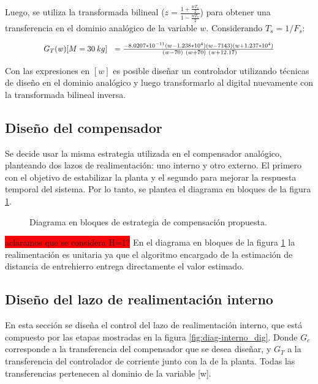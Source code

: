Luego, se utiliza la transformada bilineal ($z=\frac{1+\frac{wT_s}{2}}{1-\frac{wT_s}{2}}$) para obtener una transferencia en el dominio analógico de la variable $w$. Considerando $T_s=1/F_s$:

\begin{equation} \label{eq_Gtotal_w_m30}
	\resizebox{.8\hsize}{!}
	{
		$G_T(w)[M=30\:kg]\ \ =\frac{-8.0207*10^{-11}(w-1.238*10^4)(w-7143)(w+1.237*10^4)}{\ (w-70)\ (w+70)\ (w+12.17)}$
	}
\end{equation}


Con las expresiones en $[w]$ es posible diseñar un controlador utilizando técnicas de diseño en el dominio analógico y luego transformarlo al digital nuevamente con la transformada bilineal inversa.



\subsection{Diseño del compensador}

Se decide usar la misma estrategia utilizada en el compensador analógico, planteando dos lazos de realimentación: uno interno y otro externo. El primero con el objetivo de estabilizar la planta y el segundo para mejorar la respuesta temporal del sistema. Por lo tanto, se plantea el diagrama en bloques de la figura \ref{fig:diag-en-bloques-comp_digital}.

\begin{figure}[H]
	\centering
	\scalebox{0.8}{}
	\caption{Diagrama en bloques de estrategia de compensación propuesta.}	\label{fig:diag-en-bloques-comp_digital}
\end{figure}

\colorbox{red}{aclaramos que se considera H=1?}
En el diagrama en bloques de la figura \ref{fig:diag-en-bloques-comp_digital} la realimentación es unitaria ya que el algoritmo encargado de la estimación de distancia de entrehierro entrega directamente el valor estimado.

\subsection{Diseño del lazo de realimentación interno}

En esta sección se diseña el control del lazo de realimentación interno, que está compuesto por las etapas mostradas en la figura \ref{fig:diag-interno_dig}. Donde $G_c$ corresponde a la transferencia del compensador que se desea diseñar, y $G_{T}$ a la transferencia del controlador de corriente junto con la de la planta. Todas las transferencias pertenecen al dominio de la variable [w].

